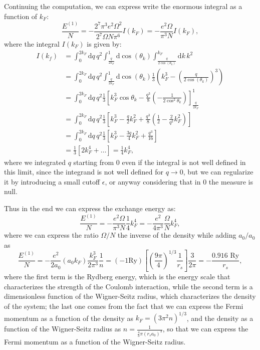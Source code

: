 Continuing the computation, we can express write the enormous integral as a function of \(k_F\):
\[
    \frac{E^{(1)}}{N} = - \frac{2^7 \pi^3 e^2 \Omega^2}{2^7 \Omega N \pi^6} I(k_F) = - \frac{e^2 \Omega}{\pi^3 N} I(k_F),
\]
where the integral \(I(k_F)\) is given by:
\[
    \begin{aligned}
        I(k_f) & = \int_0^{2k_F} \mathrm{d} q \, q^2 \int_{\tfrac{q}{2 k_F}}^{1} \mathrm{d} \cos(\theta_k) \int_{\frac{q}{2 \cos(\theta_k)}}^{k_F} \mathrm{d} k \, k^2                   \\
               & = \int_0^{2k_F} \mathrm{d} q \, q^2 \int_{\tfrac{q}{2 k_F}}^{1} \mathrm{d} \cos(\theta_k) \frac{1}{3}\left( k_F^3 - \left( \frac{q}{2 \cos(\theta_k)} \right)^3 \right) \\
               & = \int_0^{2k_F} \mathrm{d} q \, q^2 \frac{1}{3} \left[ k_F^3 \cos \theta_k - \frac{q^3}{8} \left(- \frac{1}{2 \cos^2 \theta_k}\right) \right]_{\frac{q}{2k_F}}^{1}      \\
               & = \int_0^{2k_F} \mathrm{d} q \, q^2 \frac{1}{3} \left[ k_F^3  - \frac{q}{2}k_F^2 + \frac{q^3}{8} \left( \frac{1}{2} - \frac{2}{q^2}k_F^2 \right) \right]                \\
               & = \int_0^{2k_F} \mathrm{d} q \, q^2 \frac{1}{3} \left[ k_F^3  - \frac{3q}{4}k_F^2 + \frac{q^3}{16}\right]                                                               \\
               & = \frac{1}{3} \left[ 2 k_F^4 +\dots  \right] = \frac{1}{4} k_F^4,
    \end{aligned}
\]
where we integrated \(q\) starting from 0 even if the integral is not well defined in this limit, since the integrand is not well defined for \(q \to 0\), but we can regularize it by introducing a small cutoff \(\epsilon\), or anyway considering that in 0 the measure is null.

Thus in the end we can express the exchange energy as:
\[
    \frac{E^{(1)}}{N} = - \frac{e^2 \Omega}{\pi^3 N} \frac{1}{4} k_F^4 = - \frac{e^2}{4 \pi^3} \frac{\Omega}{N} k_F^4,
\]
where we can express the ratio \(\Omega/N\) the inverse of the density while adding \(a_0 / a_0\) as
\[
    \frac{E^{(1)}}{N} = - \frac{e^2}{2 a_0} (a_0 k_F) \frac{k_F^3}{2 \pi^3} \frac{1}{n} = (- 1 \text{Ry}) \left[\left(\frac{9 \pi}{4}\right)^{1/3} \frac{1}{r_s}\right] \frac{3}{2\pi} = - \frac{0.916 \text{ Ry}}{r_s},
\]
where the first term is the Rydberg energy, which is the energy scale that characterizes the strength of the Coulomb interaction, while the second term is a dimensionless function of the Wigner-Seitz radius, which characterizes the density of the system; the last one comes from the fact that we can express the Fermi momentum as a function of the density as \(k_F = (3\pi^2 n)^{1/3}\), and the density as a function of the Wigner-Seitz radius as \(n = \frac{1}{\tfrac{4}{3} \pi (r_s a_0)^3}\), so that we can express the Fermi momentum as a function of the Wigner-Seitz radius. 

